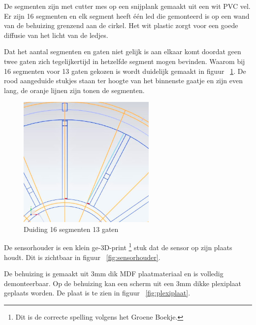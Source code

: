 \documentclass[12pt]{ugentreport}
\begin{document}
De segmenten zijn met cutter mes op een snijplank gemaakt uit een wit PVC vel.
Er zijn 16 segmenten en elk segment heeft één led die gemonteerd is op een wand
van de behuizing grenzend aan de cirkel. Het wit plastic zorgt voor een goede
diffusie van het licht van de ledjes.

Dat het aantal segmenten en gaten niet gelijk is aan elkaar komt doordat geen
twee gaten zich tegelijkertijd in hetzelfde segment mogen bevinden. Waarom bij
16 segmenten voor 13 gaten gekozen is wordt duidelijk gemaakt in figuur ~\ref{fig:duiding1316}. De
rood aangeduide stukjes staan ter hoogte van het binnenste gaatje en zijn even
lang, de oranje lijnen zijn tonen de segmenten.

\begin{figure}
  \centering
  \includegraphics[width=0.6\textwidth]{img/16vs13.jpg}
  \caption{Duiding 16 segmenten 13 gaten}
  \label{fig:duiding1316}
\end{figure}

De sensorhouder is een klein ge-3D-print \footnote{Dit is de correcte spelling volgens het Groene Boekje.} stuk dat de sensor op zijn plaats
houdt. Dit is zichtbaar in figuur ~\ref{fig:sensorhouder}.

De behuizing is gemaakt uit 3mm dik MDF plaatmateriaal en is volledig demonteerbaar.
Op de behuizing kan een scherm uit een 3mm dikke plexiplaat geplaats worden. De plaat is te zien in figuur ~\ref{fig:plexiplaat}.
\end{document}
